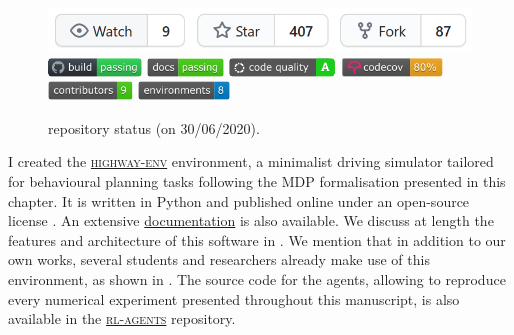 \begin{figure}[ht]
	\centering
	\includegraphics[width=0.6\linewidth]{img/he-git}\\
	\includegraphics[height=0.5cm]{img/he-buil.pdf}
	\includegraphics[height=0.5cm]{img/he-docs.pdf}
	\includegraphics[height=0.5cm]{img/he-qual.pdf}
	\includegraphics[height=0.5cm]{img/he-cov.pdf}
	\includegraphics[height=0.5cm]{img/he-contr.pdf}
	\includegraphics[height=0.5cm]{img/he-envs.pdf}
	\caption{\highwayenv repository status (on 30/06/2020).}
	\label{fig:highway-env-status}
\end{figure}

I created the \href{https://github.com/eleurent/highway-env}{\textsc{highway-env}} environment, a minimalist driving simulator tailored for behavioural planning tasks following the \gls{MDP} formalisation presented in this chapter. It is written in Python and published online under an open-source license \citep{highway-env}. An extensive \href{https://highway-env.readthedocs.io/en/latest/}{documentation} is also available. We discuss at length the features and architecture of this software in . We mention that in addition to our own works, several students and researchers already make use of this environment, as shown in . The source code for the agents, allowing to reproduce every numerical experiment presented throughout this manuscript, is also available in the \href{https://github.com/eleurent/rl-agents}{\textsc{rl-agents}} repository.